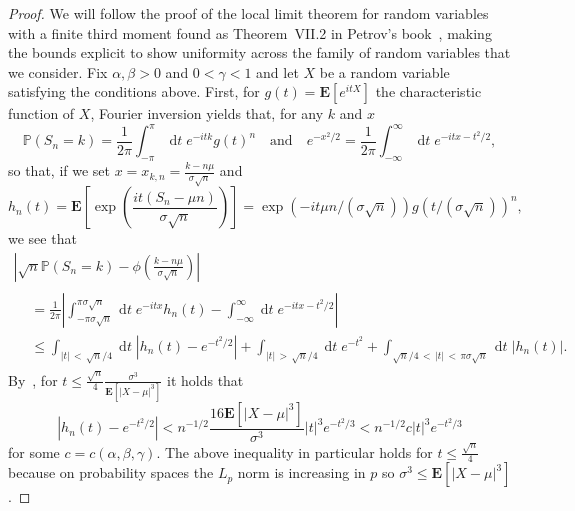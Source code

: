 \documentclass[10pt]{amsart}
\theoremstyle{definition}\newtheorem{defi}[theo]{Definition}\newtheorem{rema}[theo]{Remark}\newtheorem{exam}[theo]{Example}\newtheorem{exem}[theo]{Example}\newtheorem{nota}[theo]{Notation}
\renewcommand{\P}{\mathbb{P}}
\newcommand{\E}[1]{{\mathbf E}\left[#1\right]}
\newcommand{\bfE}{\mathbf{E}}
\DeclareMathOperator{\dtseq}{d\mathit{t}}
\begin{document}
\begin{proof}
We will follow the proof of the local limit theorem for random variables with a finite third moment found as Theorem~VII.2 in Petrov's book~\cite{Petrov}, making the bounds explicit to show uniformity across the family of random variables that we consider. Fix $\alpha, \beta>0$ and $0<\gamma<1$ and let $X$ be a random variable satisfying the conditions above. First, for $g(t)=\bfE[e^{itX}]$ the characteristic function of $X$, Fourier inversion yields that, for any $k$ and $x$
\[
\P\left(S_n=k\right)=\frac{1}{2\pi}\int_{-\pi}^\pi \dtseq e^{-itk}g(t)^n \quad \text{and} \quad e^{-x^2/2}=\frac{1}{2\pi} \int_{-\infty}^\infty \dtseq e^{-itx-t^2/2},
\]
so that, if we set $x=x_{k,n}= \frac{k-n\mu}{\sigma\sqrt{n}}$ and
\[
h_n(t)=\E{\exp\left(\frac{it(S_n-\mu n)}{\sigma \sqrt{n}}\right)}=\exp\left(-it\mu n/\left(\sigma \sqrt{n}\right)\right)g\left(t/\left(\sigma \sqrt{n}\right)\right)^n,
\]
we see that
\begin{multline}\label{eq:OoO}
\left|\sqrt{n}\P\left(S_n=k\right)-\phi\left(\frac{k-n\mu}{\sigma\sqrt{n}}\right) \right|\\
\begin{aligned}
&=\frac{1}{2\pi}\left| \int_{-\pi\sigma \sqrt{n }}^{\pi\sigma \sqrt{n }} \dtseq e^{-itx }h_{n}(t) -\int_{-\infty}^\infty \dtseq e^{-itx-t^2/2}\right| \\
&\leq \int_{|t|\,<\,\sqrt{n}/4} \dtseq \left| h_{n}(t)-e^{-t^2/2}\right| + \int_{|t|\,>\,\sqrt{n}/4} \dtseq e^{-t^2} + \int_{\sqrt{n}/4\,<\,|t|\,<\,\pi\sigma \sqrt{n }} \dtseq |h_{n}(t)|.
\end{aligned}
\end{multline}
By~\cite[Lemma~V.1]{Petrov}, for $t\leq \frac{\sqrt{n}}{4} \frac{\sigma^{3}}{\E{|X-\mu|^3}}$ it holds that
\[
\left| h_{n}(t)-e^{-t^2/2}\right| < n^{-1/2} \frac{16\E{|X-\mu|^3} }{\sigma^3} |t|^3 e^{-t^2/3}< n^{-1/2} c |t|^3 e^{-t^2/3}
\]
for some $c=c(\alpha, \beta, \gamma) $. The above inequality in particular holds for $t\leq \frac{\sqrt{n}}{4}$ because on probability spaces the $L_p$ norm is increasing in $p$ so ${\sigma^{3}}\le \E{|X-\mu|^3}$.




\end{proof}
\end{document}
